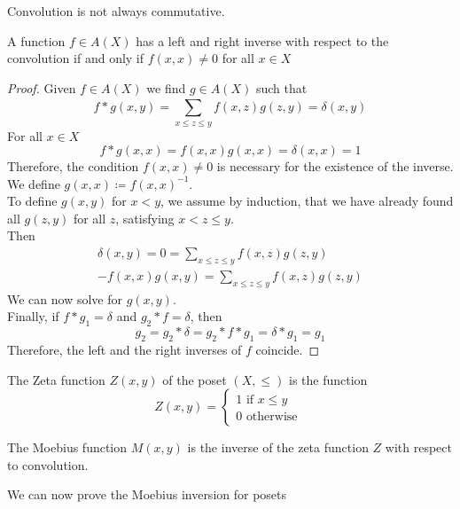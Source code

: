 \documentclass[../main.tex]{subfiles}
\begin{document}
\begin{rmq}
Convolution is not always commutative.
\end{rmq}
\begin{lemma}
	A function $f\in A( X) $ has a left and right inverse with respect to the convolution if and only if $f( x,x) \neq 0$ for all $x\in X$
\end{lemma}
\begin{proof}
	Given $f\in A( X) $ we find $g \in A( X) $ such that
	\[ 
		f \ast g ( x,y) = \sum_{x \leq z \leq y }^{ } f( x,z) g( z,y)  = \delta ( x,y) 
	\]
	For all $x \in X$ 
	\[ 
		f \ast g( x,x)  = f( x,x)  g( x,x)  = \delta ( x,x)  = 1
	\]
	Therefore, the condition $f( x,x) \neq 0 $ is necessary for the existence of the inverse.\\
	We define $g( x,x) \coloneqq f( x,x) ^{-1}$.\\
	To define $g( x,y) $ for $x <y$, we assume by induction, that we have already found all $g( z,y) $ for all $z$, satisfying $x<z \leq y$.\\
	Then
	\begin{align*}
	\delta( x,y) = 0 = \sum_{x \leq z \leq y}^{ } f( x,z)  g( z,y) \\
	- f( x,x) g( x,y) = \sum_{x \leq z \leq y}^{ } f( x,z)  g( z, y) 
	\end{align*}
	We can now solve for $g( x,y) $.\\
	Finally, if $f\ast g_1 =\delta$ and $g_2 \ast f = \delta$, then
	\[ 
	g_2 = g_2 \ast \delta = g_2 \ast f \ast g_1 = \delta \ast g_1 = g_1
	\]
	Therefore, the left and the right inverses of $f$ coincide.
\end{proof}
\begin{defn}
	The Zeta function $Z( x,y) $ of the poset $( X, \leq ) $ is the function
	\[ 
		Z( x,y)  =
		\begin{cases}
		1 \text{ if }  x \leq y\\
		0 \text{ otherwise } 
		\end{cases}
	\]
	
\end{defn}
\begin{defn}
	The Moebius function $M( x,y) $ is the inverse of the zeta function $Z$ with respect to convolution.
\end{defn}
We can now prove the Moebius inversion for posets
\end{document}

